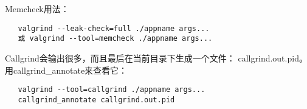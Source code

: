 Memcheck用法：
\begin{verbatim}
   valgrind --leak-check=full ./appname args...
   或 valgrind --tool=memcheck ./appname args...
\end{verbatim}


Callgrind会输出很多，而且最后在当前目录下生成一个文件： callgrind.out.pid。用callgrind\_annotate来查看它：
\begin{verbatim}
   valgrind --tool=callgrind ./appname args...
   callgrind_annotate callgrind.out.pid
\end{verbatim}
















